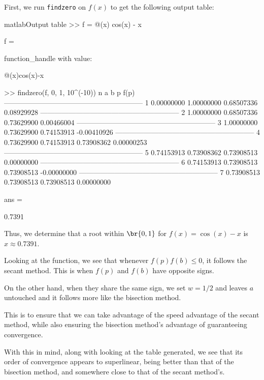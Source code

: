 \documentclass{article}
\begin{document}
\begin{solution}
First, we run \texttt{findzero} on $f(x)$ to get the following output table:

\begin{code}{matlab}{Output table}
>> f = @(x) cos(x) - x

f =

  function_handle with value:

    @(x)cos(x)-x

>> findzero(f, 0, 1, 10^(-10))
 n         a             b             p           f(p)    
-----------------------------------------------------------
1    0.00000000    1.00000000    0.68507336    0.08929928
-----------------------------------------------------------
2    1.00000000    0.68507336    0.73629900    0.00466004
-----------------------------------------------------------
3    1.00000000    0.73629900    0.74153913   -0.00410926
-----------------------------------------------------------
4    0.73629900    0.74153913    0.73908362    0.00000253
-----------------------------------------------------------
5    0.74153913    0.73908362    0.73908513    0.00000000
-----------------------------------------------------------
6    0.74153913    0.73908513    0.73908513   -0.00000000
-----------------------------------------------------------
7    0.73908513    0.73908513    0.73908513    0.00000000

ans =

  0.7391
\end{code}

Thus, we determine that a root within $\br{0, 1}$ for $f(x) = \cos (x) - x$ is $x \approx 0.7391$.

Looking at the function, we see that whenever $f(p)f(b) \leq 0$, it follows the secant method. This is when $f(p)$ and $f(b)$ have opposite signs.

On the other hand, when they share the same sign, we set $w = 1/2$ and leaves $a$ untouched and it follows more like the bisection method.

This is to ensure that we can take advantage of the speed advantage of the secant method, while also ensuring the bisection method's advantage of guaranteeing convergence.

With this in mind, along with looking at the table generated, we see that its order of convergence appears to superlinear, being better than that of the bisection method, and somewhere close to that of the secant method's.
\end{solution}
\end{document}
